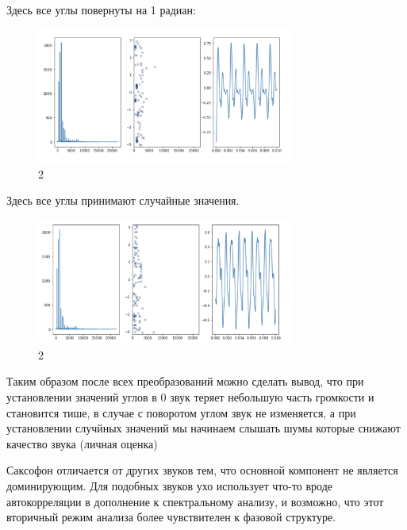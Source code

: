 \documentclass[10pt,a4paper,oneside]{article}
\begin{document}
Здесь все углы повернуты на 1 радиан: 

\begin{figure}[H]
        \centering
        \includegraphics[width=0.75\textwidth]{pics/25.png}
        \caption{2}
        \label{fig:first}
\end{figure}

Здесь все углы принимают случайные значения.

\begin{figure}[H]
        \centering
        \includegraphics[width=0.75\textwidth]{pics/26.png}
        \caption{2}
        \label{fig:first}
\end{figure}

Таким образом после всех преобразований можно сделать вывод, что при установлении значений углов в 0 звук теряет небольшую часть громкости и становится тише, в случае с поворотом углом звук не изменяется, а при установлении случйных значений мы начинаем слышать шумы которые снижают качество звука (личная оценка)

Саксофон отличается от других звуков тем, что основной компонент не является доминирующим. Для подобных звуков ухо использует что-то вроде автокорреляции в дополнение к спектральному анализу, и возможно, что этот вторичный режим анализа более чувствителен к фазовой структуре.
\end{document}
